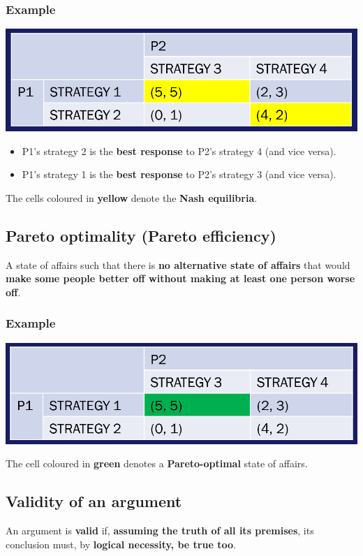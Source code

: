 \documentclass[11pt]{article}
\begin{document}
\subsubsection{Example}
\label{sec:org5b84666}
\begin{center}
\includegraphics[width=.9\linewidth]{./images/nash-equilibrium-example.png}
\end{center}
\begin{itemize}
\item P1's strategy 2 is the \textbf{best response} to P2's strategy 4 (and vice versa).
\item P1's strategy 1 is the \textbf{best response} to P2's strategy 3 (and vice versa).
\end{itemize}

The cells coloured in \textbf{yellow} denote the \textbf{Nash equilibria}.
\subsection{Pareto optimality (Pareto efficiency)}
\label{sec:orgd756a02}
A state of affairs such that there is \textbf{no alternative state of affairs} that would \textbf{make some people better off without making at least one person worse off}.
\subsubsection{Example}
\label{sec:org39030b4}
\begin{center}
\includegraphics[width=.9\linewidth]{./images/pareto-optimal-example.png}
\end{center}

The cell coloured in \textbf{green} denotes a \textbf{Pareto-optimal} state of affairs.
\subsection{Validity of an argument}
\label{sec:org860a12c}
An argument is \textbf{valid} if, \textbf{assuming the truth of all its premises}, its conclusion must, by \textbf{logical necessity, be true too}.
\end{document}
